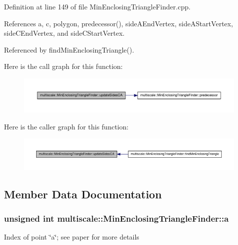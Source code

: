 \-Definition at line 149 of file \-Min\-Enclosing\-Triangle\-Finder.\-cpp.



\-References a, c, polygon, predecessor(), side\-A\-End\-Vertex, side\-A\-Start\-Vertex, side\-C\-End\-Vertex, and side\-C\-Start\-Vertex.



\-Referenced by find\-Min\-Enclosing\-Triangle().



\-Here is the call graph for this function\-:\nopagebreak
\begin{figure}[H]
\begin{center}
\leavevmode
\includegraphics[width=350pt]{classmultiscale_1_1MinEnclosingTriangleFinder_a0f4a9131f5118fa0afc33344bdf67f16_cgraph}
\end{center}
\end{figure}




\-Here is the caller graph for this function\-:\nopagebreak
\begin{figure}[H]
\begin{center}
\leavevmode
\includegraphics[width=350pt]{classmultiscale_1_1MinEnclosingTriangleFinder_a0f4a9131f5118fa0afc33344bdf67f16_icgraph}
\end{center}
\end{figure}




\subsection{\-Member \-Data \-Documentation}
\hypertarget{classmultiscale_1_1MinEnclosingTriangleFinder_acb13371219bdd9b7c57131f1535e4c89}{
\subsubsection[{a}]{\setlength{\rightskip}{0pt plus 5cm}unsigned int {\bf multiscale\-::\-Min\-Enclosing\-Triangle\-Finder\-::a}}}\label{classmultiscale_1_1MinEnclosingTriangleFinder_acb13371219bdd9b7c57131f1535e4c89}
\-Index of point \char`\"{}a\char`\"{}; see paper for more details 

